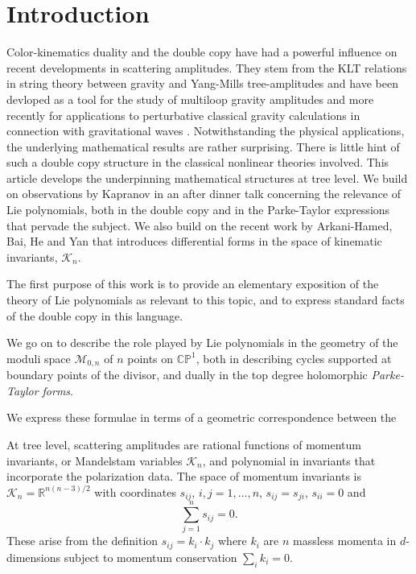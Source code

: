 \documentclass[11pt]{article}
\newcommand{\CP}{\mathbb{CP}}
\newcommand{\R}{\mathbb{R}}
\newcommand{\cK}{\mathcal{K}}
\newcommand{\cM}{\mathcal{M}}
\newcommand{\1}{{\rm 1\hskip-0.25em I}}
\begin{document}
\section{Introduction}
Color-kinematics duality and the double copy \cite{Bern:2008qj, Bern:2010ue} have had a powerful influence on recent developments in scattering amplitudes. They stem from the KLT relations in string theory \cite{Kawai:1985xq} between gravity and Yang-Mills tree-amplitudes and have been devloped as a  tool for the study of multiloop gravity amplitudes and more recently for applications to perturbative classical gravity calculations in connection with gravitational waves \cite{Bern:2019prr}.  Notwithstanding the physical applications, the underlying mathematical results are rather surprising.  There is little hint of such a double copy structure in the classical nonlinear theories involved.
This article develops the underpinning mathematical structures at tree level.  We  build on observations by Kapranov in an after dinner talk \cite{Kapranov} concerning the relevance of Lie polynomials, both in the double copy and in the Parke-Taylor expressions that pervade the subject.   We also build on the recent work by Arkani-Hamed, Bai, He and Yan \cite{Arkani-Hamed:2017mur} that introduces differential forms in the space of kinematic invariants, $\cK_n$.

The first purpose of this work is to provide an elementary exposition of the theory of Lie polynomials as relevant to this topic, and to express standard facts of the double copy in this language.  

We go on to describe the role played by Lie polynomials in the geometry of the moduli space $\cM_{0,n}$ of $n$ points on $\CP^1$, both in describing cycles supported at boundary points of the divisor, and dually in the top degree holomorphic \emph{Parke-Taylor forms}. 


We express these formulae in terms of a geometric correspondence between the 


At tree level, scattering amplitudes are rational functions of momentum invariants, or Mandelstam variables $\cK_n$, and polynomial in invariants that incorporate the polarization data.  The space of momentum invariants is $\cK_n=\R^{n(n-3)/2}$ with coordinates $s_{ij}$, $i,j=1,\ldots , n$, $s_{ij}=s_{ji}$, $s_{ii}=0$ and 
\begin{equation}
\sum_{j=1}^n s_{ij} = 0. \label{conservation}
\end{equation}
These arise from  the definition $s_{ij}=k_i\cdot k_j$ where $k_i$ are $n$ massless momenta in $d$-dimensions subject to momentum conservation $\sum_i k_i=0$.
\end{document}
